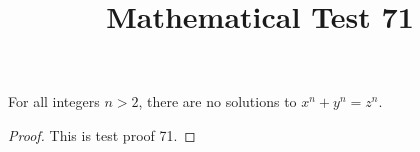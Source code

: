 \documentclass{amsart}
\begin{document}
\title{Mathematical Test 71}
\begin{theorem}
For all integers $n > 2$, there are no solutions to $x^n + y^n = z^n$.
\end{theorem}
\begin{proof}
This is test proof 71.
\end{proof}
\end{document}
